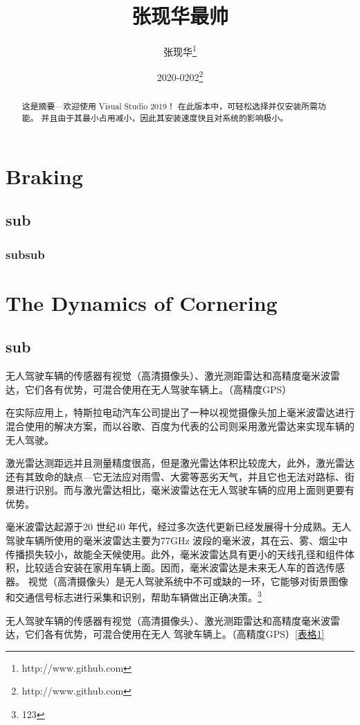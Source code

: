 \documentclass{zxhClass}
\begin{document}
	\title{张现华最帅}
	\author{张现华\thanks{http://www.github.com}}
	\date{2020-0202\thanks{http://www.github.com}}	
	\maketitle
	\newpage
	
	\begin{abstract}
		这是摘要---欢迎使用 Visual Studio 2019！ 在此版本中，可轻松选择并仅安装所需功能。 并且由于其最小占用减小，因此其安装速度快且对系统的影响极小。
	\end{abstract}



	\tableofcontents
	
	\section{Braking}
		\subsection{sub}
			\subsubsection{subsub}
	\section[Cornering]{The Dynamics of Cornering}
		\subsection{sub}
\noindent 无人驾驶车辆的传感器有视觉（高清摄像头）、激光测距雷达和高精度毫米波雷达，它们各有优势，可混合使用在无人驾驶车辆上。（高精度GPS）\par
在实际应用上，特斯拉电动汽车公司提出了一种以视觉摄像头加上毫米波雷达进行混合使用的解决方案，而以谷歌、百度为代表的公司则采用激光雷达来实现车辆的无人驾驶。\par
激光雷达测距远并且测量精度很高，但是激光雷达体积比较庞大，此外，激光雷达还有其致命的缺点—它无法应对雨雪、大雾等恶劣天气，并且它也无法对路标、街景进行识别。而与激光雷达相比，毫米波雷达在无人驾驶车辆的应用上面则更要有优势。 \par
毫米波雷达起源于20 世纪40 年代，经过多次迭代更新已经发展得十分成熟。无人驾驶车辆所使用的毫米波雷达主要为77GHz 波段的毫米波，其在云、雾、烟尘中传播损失较小，故能全天候使用。此外，毫米波雷达具有更小的天线孔径和组件体积，比较适合安装在家用车辆上面。因而，毫米波雷达是未来无人车的首选传感器。
视觉（高清摄像头）是无人驾驶系统中不可或缺的一环，它能够对街景图像和交通信号标志进行采集和识别，帮助车辆做出正确决策。\footnote{123}\par
{\CTEXnoindent 无人驾驶车辆的传感器有视觉（高清摄像头）、激光测距雷达和高精度毫米波雷达，它们各有优势，可混合使用在无人  驾驶车辆上。（高精度GPS）\ref{表格1}\par}
\end{document}

